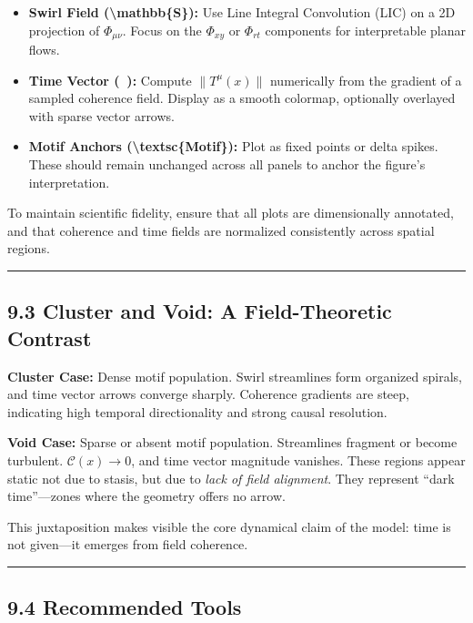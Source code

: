 \documentclass[
  11pt,
]{article}
\begin{document}
\begin{itemize}
\item
  \textbf{Swirl Field (\textbackslash mathbb\{S\}):} Use Line Integral
  Convolution (LIC) on a 2D projection of \(\Phi_{\mu\nu}\). Focus on
  the \(\Phi_{xy}\) or \(\Phi_{rt}\) components for interpretable planar
  flows.
\item
  \textbf{Time Vector (💬🫧):} Compute \(\|T^\mu(x)\|\) numerically from
  the gradient of a sampled coherence field. Display as a smooth
  colormap, optionally overlayed with sparse vector arrows.
\item
  \textbf{Motif Anchors (\textbackslash textsc\{Motif\}):} Plot as fixed
  points or delta spikes. These should remain unchanged across all
  panels to anchor the figure's interpretation.
\end{itemize}

To maintain scientific fidelity, ensure that all plots are dimensionally
annotated, and that coherence and time fields are normalized
consistently across spatial regions.

\begin{center}\rule{0.5\linewidth}{0.5pt}\end{center}

\subsection{9.3 Cluster and Void: A Field-Theoretic
Contrast}\label{cluster-and-void-a-field-theoretic-contrast}

\textbf{Cluster Case:} Dense motif population. Swirl streamlines form
organized spirals, and time vector arrows converge sharply. Coherence
gradients are steep, indicating high temporal directionality and strong
causal resolution.

\textbf{Void Case:} Sparse or absent motif population. Streamlines
fragment or become turbulent. \(\mathcal{C}(x) \to 0\), and time vector
magnitude vanishes. These regions appear static not due to stasis, but
due to \emph{lack of field alignment}. They represent ``dark
time''---zones where the geometry offers no arrow.

This juxtaposition makes visible the core dynamical claim of the model:
time is not given---it emerges from field coherence.

\begin{center}\rule{0.5\linewidth}{0.5pt}\end{center}

\subsection{9.4 Recommended Tools}\label{recommended-tools}
\end{document}
